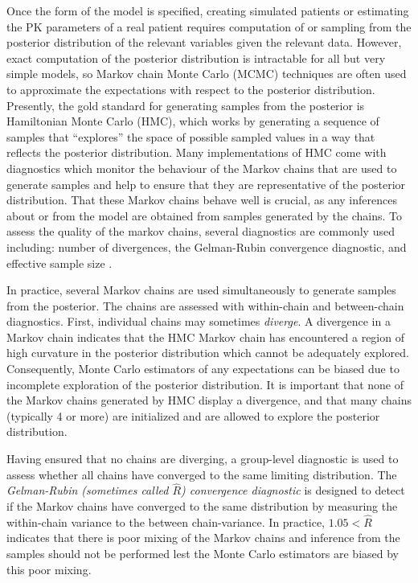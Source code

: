 Once the form of the model is specified, creating simulated patients or estimating the PK parameters of a real patient requires computation of or sampling from the posterior distribution of the relevant variables given the relevant data. However, exact computation of the posterior distribution is intractable for all but very simple models, so Markov chain Monte Carlo (MCMC) techniques are often used to approximate the expectations with respect to the posterior distribution.  Presently, the gold standard for generating samples from the posterior is Hamiltonian Monte Carlo (HMC), which works by generating a sequence of samples that ``explores'' the space of possible sampled values in a way that reflects the posterior distribution.  Many implementations of HMC come with diagnostics which monitor the behaviour of the Markov chains that are used to generate samples and help to ensure that they are representative of the posterior distribution. That these Markov chains behave well is crucial, as any inferences about or from the model are obtained from samples generated by the chains. To assess the quality of the markov chains, several diagnostics are commonly used including: number of divergences, the Gelman-Rubin convergence diagnostic, and effective sample size \cite{betancourt2018conceptual}.

In practice, several Markov chains are used simultaneously to generate samples from the posterior. The chains are assessed with within-chain and between-chain diagnostics. First, individual chains may sometimes \textit{diverge}. A divergence in a Markov chain indicates that the HMC Markov chain has encountered a region of high curvature in the posterior distribution which cannot be adequately explored.  Consequently, Monte Carlo estimators of any expectations can be biased due to incomplete exploration of the posterior distribution.  It is important that none of the Markov chains generated by HMC display a divergence, and that many chains (typically 4 or more) are initialized and are allowed to explore the posterior distribution. 

Having ensured that no chains are diverging, a group-level diagnostic is used to assess whether all chains have converged to the same limiting distribution.  The \textit{Gelman-Rubin (sometimes called $\hat{R}$) convergence diagnostic} is designed to detect if the Markov chains have converged to the same distribution by measuring the within-chain variance to the between chain-variance. In practice, $1.05<\hat{R}$ indicates that there is poor mixing of the Markov chains and inference from the samples should not be performed lest the Monte Carlo estimators are biased by this poor mixing.

